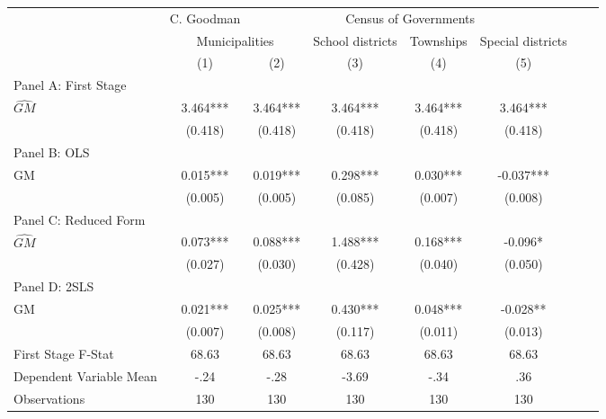    \begin{tabular}{l*{7}{c}} \toprule
&\multicolumn{1}{c}{C. Goodman}&\multicolumn{4}{c}{Census of Governments}\\\cmidrule(lr){2-2}\cmidrule(lr){3-6}
&\multicolumn{2}{c}{Municipalities}&\multicolumn{1}{c}{School districts}&\multicolumn{1}{c}{Townships}&\multicolumn{1}{c}{Special districts}\\\cmidrule(lr){2-3}\cmidrule(lr){4-6}
&\multicolumn{1}{c}{(1)}&\multicolumn{1}{c}{(2)}&\multicolumn{1}{c}{(3)}&\multicolumn{1}{c}{(4)}&\multicolumn{1}{c}{(5)}\\
\cmidrule(lr){1-6}
\multicolumn{5}{l}{Panel A: First Stage}\\
\cmidrule(lr){1-6}
$\widehat{GM}$  &    3.464***&    3.464***&    3.464***&    3.464***&    3.464***\\
                &  (0.418)   &  (0.418)   &  (0.418)   &  (0.418)   &  (0.418)   \\
\cmidrule(lr){1-6}
\multicolumn{5}{l}{Panel B: OLS}\\
\cmidrule(lr){1-6}
GM              &    0.015***&    0.019***&    0.298***&    0.030***&   -0.037***\\
                &  (0.005)   &  (0.005)   &  (0.085)   &  (0.007)   &  (0.008)   \\
\cmidrule(lr){1-6}
\multicolumn{5}{l}{Panel C: Reduced Form}\\
\cmidrule(lr){1-6}
$\widehat{GM}$  &    0.073***&    0.088***&    1.488***&    0.168***&   -0.096*  \\
                &  (0.027)   &  (0.030)   &  (0.428)   &  (0.040)   &  (0.050)   \\
\cmidrule(lr){1-6}
\multicolumn{5}{l}{Panel D: 2SLS}\\
\cmidrule(lr){1-6}
GM              &    0.021***&    0.025***&    0.430***&    0.048***&   -0.028** \\
                &  (0.007)   &  (0.008)   &  (0.117)   &  (0.011)   &  (0.013)   \\
\midrule
First Stage F-Stat&    68.63   &    68.63   &    68.63   &    68.63   &    68.63   \\
Dependent Variable Mean&     -.24   &     -.28   &    -3.69   &     -.34   &      .36   \\
Observations    &      130   &      130   &      130   &      130   &      130   \\
       \bottomrule \end{tabular}
